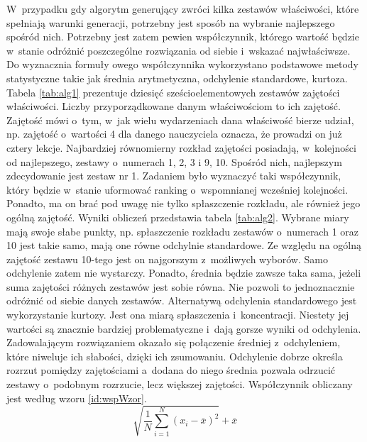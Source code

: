 \documentclass[a4paper]{book}
\begin{document}
W~przypadku gdy algorytm generujący zwróci kilka zestawów właściwości, które spełniają warunki generacji, potrzebny jest sposób na wybranie najlepszego spośród nich. Potrzebny jest zatem pewien współczynnik, którego wartość będzie w~stanie odróżnić poszczególne rozwiązania od siebie i~wskazać najwłaściwsze. Do wyznacznia formuły owego współczynnika wykorzystano podstawowe metody statystyczne takie jak średnia arytmetyczna, odchylenie standardowe, kurtoza. Tabela \ref{tab:alg1} prezentuje dziesięć sześcioelementowych zestawów zajętości właściwości. Liczby przyporządkowane danym właściwościom to ich zajętość. Zajętość mówi o~tym, w~jak wielu wydarzeniach dana właściwość bierze udział, np. zajętość o~wartości 4 dla danego nauczyciela oznacza, że prowadzi on już cztery lekcje. Najbardziej równomierny rozkład zajętości posiadają, w~kolejności od najlepszego, zestawy o~numerach 1, 2, 3 i 9, 10. Spośród nich, najlepszym zdecydowanie jest zestaw nr 1. Zadaniem było wyznaczyć taki współczynnik, który będzie w~stanie uformować ranking o~wspomnianej wcześniej kolejności. Ponadto, ma on brać pod uwagę nie tylko spłaszczenie rozkładu, ale również jego ogólną zajętość. Wyniki obliczeń przedstawia tabela \ref{tab:alg2}. Wybrane miary mają swoje słabe punkty, np. spłaszczenie rozkładu zestawów o~numerach 1 oraz 10 jest takie samo, mają one równe odchylnie standardowe. Ze względu na ogólną zajętość zestawu 10-tego jest on najgorszym z~możliwych wyborów. Samo odchylenie zatem nie wystarczy. Ponadto, średnia będzie zawsze taka sama, jeżeli suma zajętości różnych zestawów jest sobie równa. Nie pozwoli to jednoznacznie odróżnić od siebie danych zestawów. Alternatywą odchylenia standardowego jest wykorzystanie kurtozy. Jest ona miarą spłaszczenia i~koncentracji. Niestety jej wartości są znacznie bardziej problematyczne i~dają gorsze wyniki od odchylenia. Zadowalającym rozwiązaniem okazało się połączenie średniej z~odchyleniem, które niweluje ich słabości, dzięki ich zsumowaniu. Odchylenie dobrze określa rozrzut pomiędzy zajętościami a~dodana do niego średnia pozwala odrzucić zestawy o~podobnym rozrzucie, lecz większej zajętości. Współczynnik obliczany jest według wzoru \ref{id:wspWzor}.
\begin{equation}
\sqrt{\frac{1}{N} \sum_{i=1}^N (x_i - \overline{x})^2} + \overline{x}
\label{id:wspWzor}
\end{equation}
\end{document}
